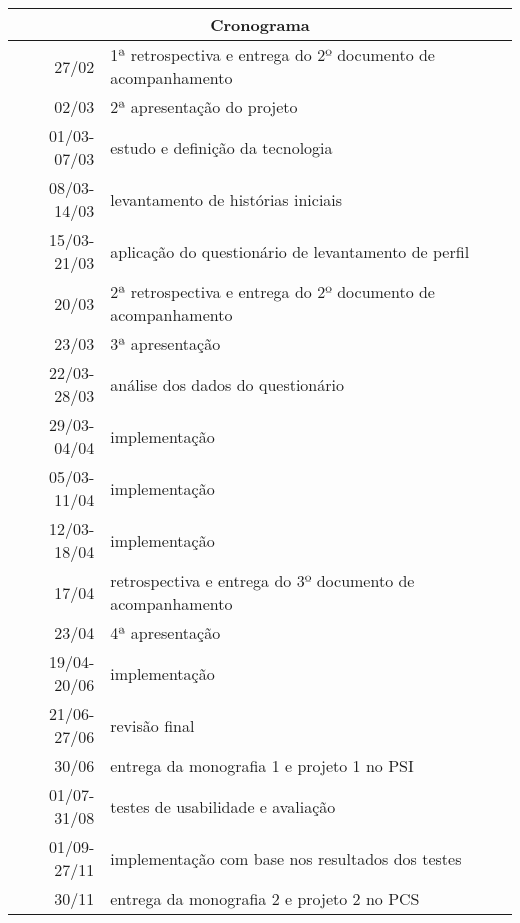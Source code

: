 \documentclass[a4paper,12pt,font=plain,header=plain]{abnt}
\begin{document}
	\begin{tabular}[|l|]{ |r|l| }
	\hline
		\multicolumn{2}{|c|}{\textbf{Cronograma}} \\
	\hline
		27/02 & 1ª retrospectiva e entrega do 2º documento de acompanhamento \\
	\hline
		02/03 & 2ª apresentação do projeto \\
	\hline
		01/03-07/03 & estudo e definição da tecnologia \\
	\hline
		08/03-14/03 & levantamento de histórias iniciais \\
	\hline
		15/03-21/03 & aplicação do questionário de levantamento de perfil \\
	\hline
		20/03 & 2ª retrospectiva e entrega do 2º documento de acompanhamento \\
	\hline
		23/03 & 3ª apresentação \\
	\hline
		22/03-28/03 & análise dos dados do questionário \\
	\hline
		29/03-04/04 & implementação \\
	\hline
		05/03-11/04 & implementação \\
	\hline
		12/03-18/04 & implementação \\
	\hline
		17/04 & retrospectiva e entrega do 3º documento de acompanhamento \\
	\hline
		23/04 & 4ª apresentação \\
	\hline
		19/04-20/06 & implementação \\
	\hline
		21/06-27/06 & revisão final \\
	\hline
		30/06 & entrega da monografia 1 e projeto 1 no PSI \\
	\hline
		01/07-31/08 & testes de usabilidade e avaliação \\
	\hline
		01/09-27/11 & implementação com base nos resultados dos testes \\
	\hline
		30/11 & entrega da monografia 2 e projeto 2 no PCS \\
	\hline
	\end{tabular} \\
\end{document}
